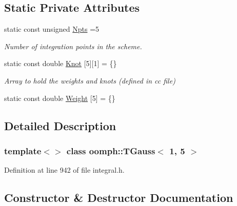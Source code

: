 \subsection*{Static Private Attributes}
\begin{DoxyCompactItemize}
\item 
static const unsigned \hyperlink{classoomph_1_1TGauss_3_011_00_015_01_4_a084afcbba5a00a9c929c5e865474b921}{Npts} =5
\begin{DoxyCompactList}\small\item\em Number of integration points in the scheme. \end{DoxyCompactList}\item 
static const double \hyperlink{classoomph_1_1TGauss_3_011_00_015_01_4_a9aad9d3db2a62676a8ab40d3e549d43f}{Knot} \mbox{[}5\mbox{]}\mbox{[}1\mbox{]} = \{\}
\begin{DoxyCompactList}\small\item\em Array to hold the weights and knots (defined in cc file) \end{DoxyCompactList}\item 
static const double \hyperlink{classoomph_1_1TGauss_3_011_00_015_01_4_a6d954bc8909328f8081c27098b476657}{Weight} \mbox{[}5\mbox{]} = \{\}
\end{DoxyCompactItemize}


\subsection{Detailed Description}
\subsubsection*{template$<$$>$\newline
class oomph\+::\+T\+Gauss$<$ 1, 5 $>$}



Definition at line 942 of file integral.\+h.



\subsection{Constructor \& Destructor Documentation}
\mbox{\label{classoomph_1_1TGauss_3_011_00_015_01_4_a7b58bb0e2fc65e82d3423d739c3d825f}} 
